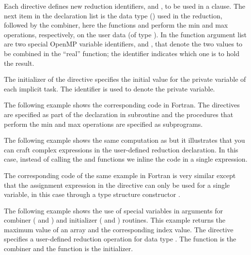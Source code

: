 Each  directive defines new reduction identifiers,
 and , to be used in a  clause. The next item in the
declaration list is the data type () used in the reduction,
followed by the combiner, here the functions  and  perform
the min and max operations, respectively, on the user data (of type ).
In the function argument list are two special OpenMP variable identifiers,  and ,
that denote the two values to be combined in the ``real'' function;
the  identifier indicates which one is to hold the result.

The initializer of the  directive specifies
the initial value for the private variable of each implicit task.
The  identifier is used to denote the private variable.


The following example shows the corresponding code in Fortran. 
The  directives are specified as part of 
the declaration in subroutine  and 
the procedures that perform the min and max operations are specified as subprograms.



The following example shows the same computation as  but it illustrates that you can craft complex expressions in the user-defined 
reduction declaration. In this case, instead of calling the  
and  functions we inline the code in a single expression.


The corresponding code of the same example in Fortran is very similar
except that the assignment expression in the 
directive can only be used for a single variable, in this case through
a type structure constructor .



The following example shows the use of special variables in arguments for 
combiner ( and ) and initializer ( 
and ) routines.  This example returns the maximum value of an 
array and the corresponding index value. The  
directive specifies a user-defined reduction operation  for 
data type . The function  is the combiner 
and the function  is the initializer.

